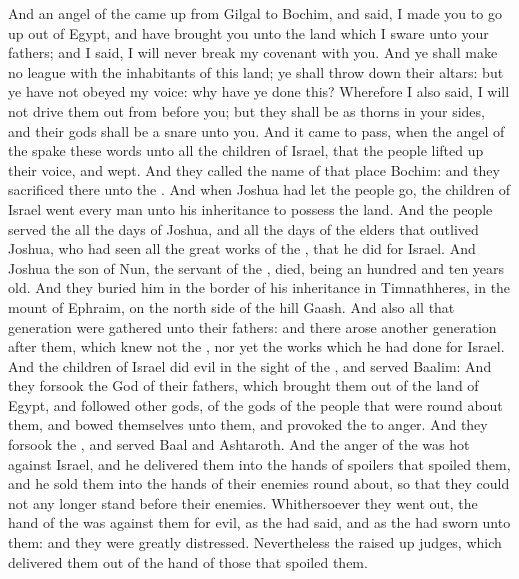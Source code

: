 \begin{biblechapter} %
 And an angel of the \LORD came up from Gilgal to Bochim, and said, I made you to go up out of Egypt, and have brought you unto the land which I sware unto your fathers; and I said, I will never break my covenant with you.
\verse And ye shall make no league with the inhabitants of this land; ye shall throw down their altars: but ye have not obeyed my voice: why have ye done this?
\verse Wherefore I also said, I will not drive them out from before you; but they shall be as thorns in your sides, and their gods shall be a snare unto you.
\verse And it came to pass, when the angel of the \LORD spake these words unto all the children of Israel, that the people lifted up their voice, and wept.
\verse And they called the name of that place Bochim: and they sacrificed there unto the \LORD.
\vfill\columnbreak %
 And when Joshua had let the people go, the children of Israel went every man unto his inheritance to possess the land.
\verse And the people served the \LORD all the days of Joshua, and all the days of the elders that outlived Joshua, who had seen all the great works of the \LORD, that he did for Israel.
\verse And Joshua the son of Nun, the servant of the \LORD, died, being an hundred and ten years old.
\verse And they buried him in the border of his inheritance in Timnathheres, in the mount of Ephraim, on the north side of the hill Gaash.
\verse And also all that generation were gathered unto their fathers: and there arose another generation after them, which knew not the \LORD, nor yet the works which he had done for Israel.
\verse And the children of Israel did evil in the sight of the \LORD, and served Baalim:
\verse And they forsook the \LORD God of their fathers, which brought them out of the land of Egypt, and followed other gods, of the gods of the people that were round about them, and bowed themselves unto them, and provoked the \LORD to anger.
\verse And they forsook the \LORD, and served Baal and Ashtaroth.
\verse And the anger of the \LORD was hot against Israel, and he delivered them into the hands of spoilers that spoiled them, and he sold them into the hands of their enemies round about, so that they could not any longer stand before their enemies.
\verse Whithersoever they went out, the hand of the \LORD was against them for evil, as the \LORD had said, and as the \LORD had sworn unto them: and they were greatly distressed.
\verse Nevertheless the \LORD raised up judges, which delivered them out of the hand of those that spoiled them.

\end{biblechapter}

